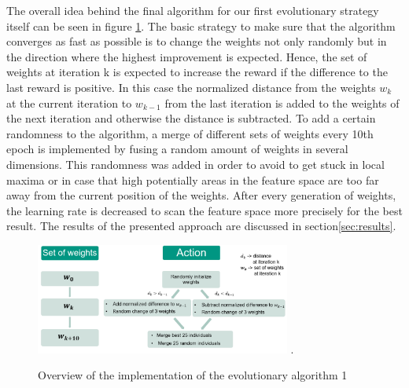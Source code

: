 The overall idea behind the final algorithm for our first evolutionary strategy itself can be seen in figure \ref{fig:evo_strat_1}. The basic strategy to make sure that the algorithm converges as fast as possible is to change the weights not only randomly but in the direction where the highest improvement is expected. Hence, the set of weights at iteration k is expected to increase the reward if the difference to the last reward is positive. In this case the normalized distance from the weights $w_k$  at the current iteration to $w_{k-1}$ from the last iteration is added to the weights of the next iteration and otherwise the distance is subtracted. To add a certain randomness to the algorithm, a merge of different sets of weights every 10th epoch is implemented by fusing a random amount of weights in several dimensions. This randomness was added in order to avoid to get stuck in local maxima or in case that high potentially areas in the feature space are too far away from the current position of the weights. After every generation of weights, the learning rate is decreased to scan the feature space more precisely for the best result. 
The results of the presented approach are discussed in section\ref{sec:results}.

\begin{figure}[H]
	\centering
	\includegraphics[width=3.3in]{img/evo_strat_1.png}
	\DeclareGraphicsExtensions.
	\caption{Overview of the implementation of the evolutionary algorithm 1}
	\label{fig:evo_strat_1}
\end{figure}

